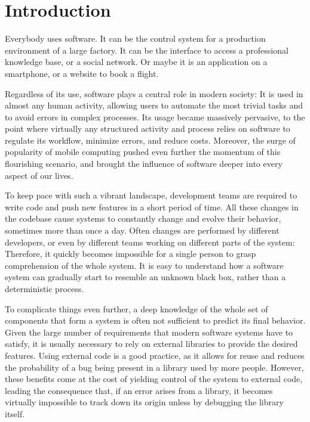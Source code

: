 
\chapter{Introduction}\label{ch:introduction}

Everybody uses software.
It can be the control system for a production environment of a large factory.
It can be the interface to access a professional knowledge base, or a social network.
Or maybe it is an application on a smartphone, or a website to book a flight.

Regardless of its use, software plays a central role in modern society: It is used in almost any human activity, allowing users to automate the most trivial tasks and to avoid errors in complex processes.
Its usage became massively pervasive, to the point where virtually any structured activity and process relies on software to regulate its workflow, minimize errors, and reduce costs.
Moreover, the surge of popularity of mobile computing pushed even further the momentum of this flourishing scenario, and brought the influence of software deeper into every aspect of our lives.

To keep pace with such a vibrant landscape, development teams are required to write code and push new features in a short period of time.
All these changes in the codebase cause systems to constantly change and evolve their behavior, sometimes more than once a day.
Often changes are performed by different developers, or even by different teams working on different parts of the system: Therefore, it quickly becomes impossible for a single person to grasp comprehension of the whole system.
It is easy to understand how a software system can gradually start to resemble an unknown black box, rather than a deterministic process.

To complicate things even further, a deep knowledge of the whole set of components that form a system is often not sufficient to predict its final behavior.
Given the large number of requirements that modern software systems have to satisfy, it is usually necessary to rely on external libraries to provide the desired features.
Using external code is a good practice, as it allows for reuse and reduces the probability of a bug being present in a library used by more people.
However, these benefits come at the cost of yielding control of the system to external code, leading the consequence that, if an error arises from a library, it becomes virtually impossible to track down its origin unless by debugging the library itself.

